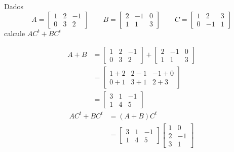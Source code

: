 \documentclass[a4paper,12pt,fleqn]{article}
\begin{document}

Dados
\[
  A = \begin{bmatrix}
    1 & 2 & -1 \\
    0 & 3 & 2
  \end{bmatrix}
\qquad
  B = \begin{bmatrix}
    2 & -1 & 0 \\
    1 & 1  & 3
  \end{bmatrix}
\qquad
  C = \begin{bmatrix}
    1 & 2  & 3 \\
    0 & -1 & 1
  \end{bmatrix}
\]
calcule \(AC^t + BC^t\)

\begin{answer}
  \begin{align*}
    A + B
    & =
      \begin{bmatrix}
        1 & 2 & -1 \\
        0 & 3 & 2
      \end{bmatrix}
      +
      \begin{bmatrix}
        2 & -1 & 0 \\
        1 & 1  & 3
      \end{bmatrix}
    \\[2mm]
    & =
      \begin{bmatrix}
        1 + 2 & 2 - 1 & -1 + 0 \\
        0 + 1 & 3 + 1 &  2 + 3
      \end{bmatrix}
    \\[2mm]
    & =
      \begin{bmatrix}
        3 & 1 & -1 \\
        1 & 4 &  5
      \end{bmatrix}
  \end{align*}
  \begin{align*}
    AC^t + BC^t
    & = (A + B)C^t
    \\
    & =
      \begin{bmatrix}
        3 & 1 & -1 \\
        1 & 4 &  5
      \end{bmatrix}
      \begin{bmatrix}
        1 & 0  \\
        2 & -1 \\
        3 & 1
      \end{bmatrix}

\end{align*}
\end{answer}
\end{document}
